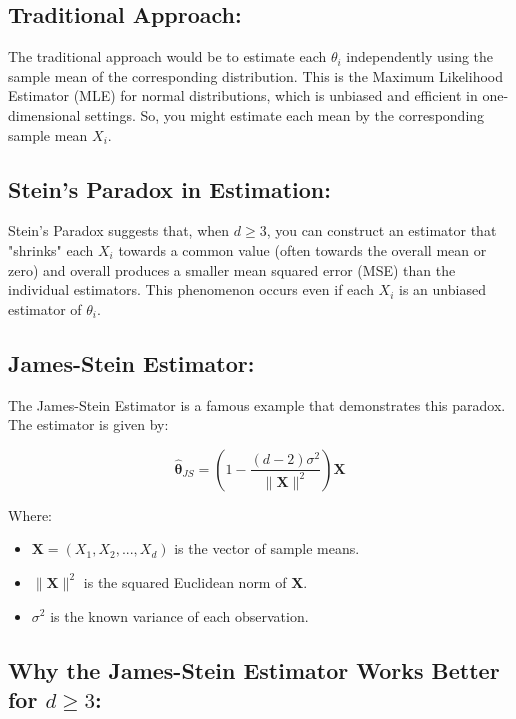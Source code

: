 \documentclass{article}
\begin{document}
\subsection*{Traditional Approach:}

The traditional approach would be to estimate each \(\theta_i\) independently using the sample mean of the corresponding distribution. This is the Maximum Likelihood Estimator (MLE) for normal distributions, which is unbiased and efficient in one-dimensional settings. So, you might estimate each mean by the corresponding sample mean \(X_i\).

\subsection*{Stein's Paradox in Estimation:}

Stein's Paradox suggests that, when \(d \geq 3\), you can construct an estimator that "shrinks" each \(X_i\) towards a common value (often towards the overall mean or zero) and overall produces a smaller mean squared error (MSE) than the individual estimators. This phenomenon occurs even if each \(X_i\) is an unbiased estimator of \(\theta_i\).

\subsection*{James-Stein Estimator:}

The James-Stein Estimator is a famous example that demonstrates this paradox. The estimator is given by:

\[
\hat{\boldsymbol{\theta}}_{JS} = \left(1 - \frac{(d-2) \sigma^2}{\|\boldsymbol{X}\|^2}\right) \boldsymbol{X}
\]

Where:

\begin{itemize}
    \item \(\boldsymbol{X} = (X_1, X_2, ..., X_d)\) is the vector of sample means.
    \item \(\|\boldsymbol{X}\|^2\) is the squared Euclidean norm of \(\boldsymbol{X}\).
    \item \(\sigma^2\) is the known variance of each observation.
\end{itemize}

\subsection*{Why the James-Stein Estimator Works Better for \(d \geq 3\):}
\end{document}
